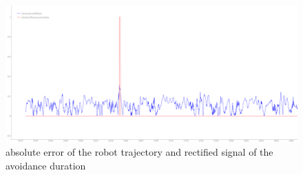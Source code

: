 \begin{figure}[H]
	\includegraphics[width=\textwidth]{Pictures/final analysis no obstacle}
	\caption{absolute error of the robot trajectory and rectified signal of the avoidance duration}
	\label{noobserr}
\end{figure}

